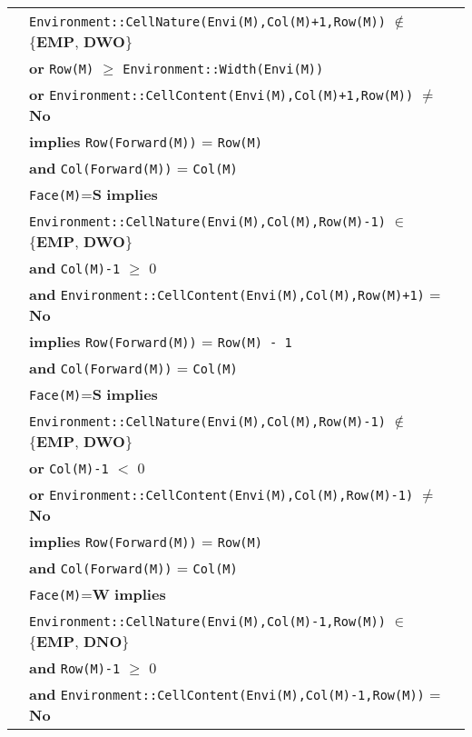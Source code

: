 \documentclass{article}
\begin{document}
\begin{tabular}{rl}
& \quad\quad\quad\quad \texttt{Environment::CellNature(Envi(M),Col(M)+1,Row(M))} $\notin$ \{\textbf{EMP}, \textbf{DWO}\} \\
& \quad\quad\quad\quad \textbf{or} \texttt{Row(M)} $\geq$ \texttt{Environment::Width(Envi(M))} \\
& \quad\quad\quad\quad \textbf{or} \texttt{Environment::CellContent(Envi(M),Col(M)+1,Row(M))} $\neq$ \textbf{No} \\
& \quad\quad\quad\quad \textbf{implies} \texttt{Row(Forward(M))} = \texttt{Row(M)} \\
& \quad\quad\quad\quad \textbf{and} \texttt{Col(Forward(M))} = \texttt{Col(M)} \\
& \texttt{Face(M)}=\textbf{S} \textbf{implies} \\
& \quad\quad\quad\quad \texttt{Environment::CellNature(Envi(M),Col(M),Row(M)-1)} $\in$ \{\textbf{EMP}, \textbf{DWO}\} \\
& \quad\quad\quad\quad \textbf{and} \texttt{Col(M)-1} $\geq$ 0 \\
& \quad\quad\quad\quad \textbf{and} \texttt{Environment::CellContent(Envi(M),Col(M),Row(M)+1)} = \textbf{No} \\
& \quad\quad\quad\quad \textbf{implies} \texttt{Row(Forward(M))} = \texttt{Row(M) - 1} \\
& \quad\quad\quad\quad \textbf{and} \texttt{Col(Forward(M))} = \texttt{Col(M)} \\
& \texttt{Face(M)}=\textbf{S} \textbf{implies} \\
& \quad\quad\quad\quad \texttt{Environment::CellNature(Envi(M),Col(M),Row(M)-1)} $\notin$ \{\textbf{EMP}, \textbf{DWO}\} \\
& \quad\quad\quad\quad \textbf{or} \texttt{Col(M)-1} $<$ 0 \\
& \quad\quad\quad\quad \textbf{or} \texttt{Environment::CellContent(Envi(M),Col(M),Row(M)-1)} $\neq$ \textbf{No} \\
& \quad\quad\quad\quad \textbf{implies} \texttt{Row(Forward(M))} = \texttt{Row(M)} \\
& \quad\quad\quad\quad \textbf{and} \texttt{Col(Forward(M))} = \texttt{Col(M)} \\
& \texttt{Face(M)}=\textbf{W} \textbf{implies} \\
& \quad\quad\quad\quad \texttt{Environment::CellNature(Envi(M),Col(M)-1,Row(M))} $\in$ \{\textbf{EMP}, \textbf{DNO}\} \\
& \quad\quad\quad\quad \textbf{and} \texttt{Row(M)-1} $\geq$ 0 \\
& \quad\quad\quad\quad \textbf{and} \texttt{Environment::CellContent(Envi(M),Col(M)-1,Row(M))} = \textbf{No} \\

\end{tabular}
\end{document}
